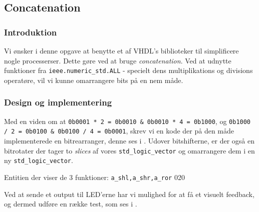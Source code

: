 

\subsection{Concatenation}

\subsubsection{Introduktion}
Vi ønsker i denne opgave at benytte et af VHDL's biblioteker til simplificere nogle processerser. Dette gøre ved at bruge \textit{concatenation}. Ved at udnytte funktioner fra \texttt{ieee.numeric\_std.ALL} - specielt dens multiplikations og divisions operatøre, vil vi kunne omarrangere bits på en nem måde.
\subsubsection{Design og implementering}

Med en viden om at \texttt{0b0001 * 2 = 0b0010 \& 0b0010 * 4 = 0b1000}, og \texttt{0b1000 / 2 = 0b0100 \& 0b0100 / 4 = 0b0001}, skrev vi en kode der på den måde implementerede en bitrearranger, denne ses i . Udover bitshifterne, er der også en bitrotater der tager to \textit{slices} af vores \texttt{std\_logic\_vector} og omarrangere dem i en ny \texttt{std\_logic\_vector}.

{Entitien der viser de 3 funktioner: \texttt{a\_shl,a\_shr,a\_ror}}
{0}{20}


Ved at sende et output til LED'erne har vi mulighed for at få et visuelt feedback, og dermed udføre en række test, som ses i .


